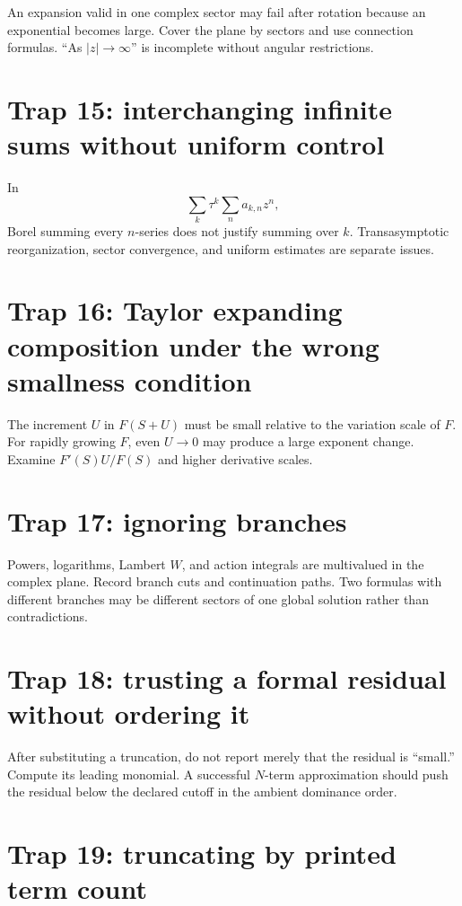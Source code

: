 \documentclass[11pt,openany]{book}
\theoremstyle{definition}
\theoremstyle{plain}
\theoremstyle{remark}
\begin{document}
An expansion valid in one complex sector may fail after rotation because an exponential becomes large. Cover the plane by sectors and use connection formulas. ``As $|z|\to\infty$'' is incomplete without angular restrictions.

\section{Trap 15: interchanging infinite sums without uniform control}

In
\[
 \sum_k\tau^k\sum_na_{k,n}z^n,
\]
Borel summing every $n$-series does not justify summing over $k$. Transasymptotic reorganization, sector convergence, and uniform estimates are separate issues.

\section{Trap 16: Taylor expanding composition under the wrong smallness condition}

The increment $U$ in $F(S+U)$ must be small relative to the variation scale of $F$. For rapidly growing $F$, even $U\to0$ may produce a large exponent change. Examine $F'(S)U/F(S)$ and higher derivative scales.

\section{Trap 17: ignoring branches}

Powers, logarithms, Lambert $W$, and action integrals are multivalued in the complex plane. Record branch cuts and continuation paths. Two formulas with different branches may be different sectors of one global solution rather than contradictions.

\section{Trap 18: trusting a formal residual without ordering it}

After substituting a truncation, do not report merely that the residual is ``small.'' Compute its leading monomial. A successful $N$-term approximation should push the residual below the declared cutoff in the ambient dominance order.

\section{Trap 19: truncating by printed term count}
\end{document}
